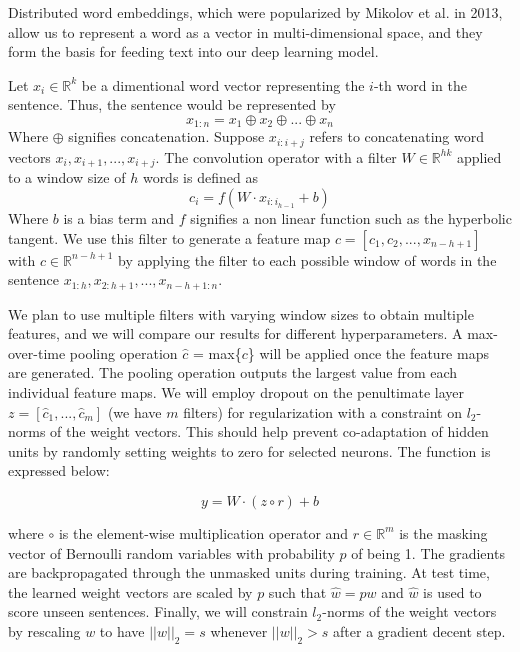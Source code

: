 \documentclass[conference]{IEEEtran}
\begin{document}
     Distributed word embeddings, which were popularized by Mikolov et al.
     in 2013\cite{word2vec}, allow us to represent a word as a vector in
     multi-dimensional space, and they form the basis for feeding text into our deep
     learning model.

     Let $x_{i} \in \mathbb{R}^k$ be a dimentional word vector representing the $i$-th word in the 
     sentence. Thus, the sentence would be represented by 
     \begin{equation}
      x_{1:n} = x_1 \oplus x_2 \oplus ... \oplus x_n
      \end{equation}
      Where $\oplus$ signifies concatenation. Suppose $x_{i:i+j}$ refers to concatenating 
      word vectors $x_i, x_{i+1}, ... , x_{i+j}$. The convolution operator with a filter
       $W \in \mathbb{R}^{hk}$ applied to a window size of $h$ 
      words is defined as 
      \begin{equation}
      c_i = f(W \cdot x_{i:i_{h-1}} + b)
      \end{equation}
      Where $b$ is a bias term and $f$ signifies a non linear function such as the hyperbolic
      tangent. We use this filter to generate a feature map $c = [c_1, c_2, ... ,x_{n-h+1}]$ 
      with $c \in \mathbb{R}^{n-h+1}$ by applying the filter to each possible window of words in
      the sentence $x_{1:h}, x_{2:h+1}, ... ,x_{n-h+1:n}$. 
 
      We plan to use multiple filters with varying window sizes to obtain multiple features, and we will      
      compare our results for different hyperparameters. 
      A max-over-time pooling operation $\hat{c}$ = max\{$c$\} will be applied once the feature 
      maps are generated. The pooling operation outputs the largest value from each individual
      feature maps. We will employ dropout on the penultimate layer $z = [\hat{c}_1,...,\hat{c}_m]$ 
      (we have $m$ filters) for regularization with a constraint on $l_2$-norms of the weight
      vectors. This should help prevent co-adaptation of hidden units by randomly setting weights 
      to zero for selected neurons. The function is expressed below: 
 
      \begin{equation}
       y = W \cdot (z \circ r) + b
      \end{equation}
      
      where $\circ$ is the element-wise multiplication operator and $r \in \mathbb{R}^m$ is 
      the masking vector of Bernoulli random variables with probability $p$ of being 1. 
      The gradients are backpropagated through the unmasked units during training. At test 
      time, the learned weight vectors are scaled by $p$ such that $\hat{w} = pw$ and $\hat{w}$ 
      is used to score unseen sentences. Finally, we will constrain $l_2$-norms of the weight 
      vectors by rescaling $w$ to have $||w||_2 = s$ whenever $||w||_2 > s$ after a gradient
      decent step.
      
\end{document}
